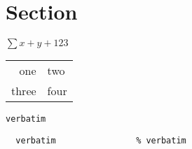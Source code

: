 \documentclass{article}
\begin{document}
\maketitle                %
\section{Section}         %
\(\sum x + y + 123\)      %
\begin{tabular}{r l}      %
  one & two \\            %
  three & four \\
\end{tabular}             %
\verb|verbatim|           %
\begin{verbatim}
  verbatim                % verbatim
\end{verbatim}
\end{document}
